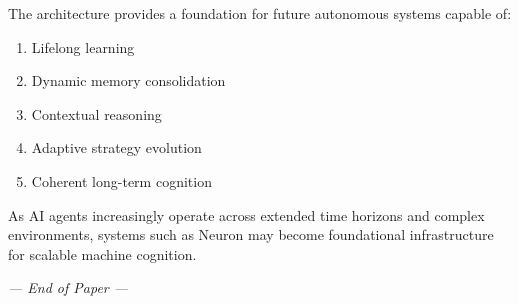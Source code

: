 \documentclass[11pt,a4paper]{article}
\begin{document}
The architecture provides a foundation for future autonomous systems capable of:

\begin{enumerate}
    \item Lifelong learning
    \item Dynamic memory consolidation
    \item Contextual reasoning
    \item Adaptive strategy evolution
    \item Coherent long-term cognition
\end{enumerate}

As AI agents increasingly operate across extended time horizons and complex
environments, systems such as Neuron may become foundational infrastructure for
scalable machine cognition.

\vspace{0.8cm}
\begin{center}
    \textit{--- End of Paper ---}
\end{center}
\end{document}
